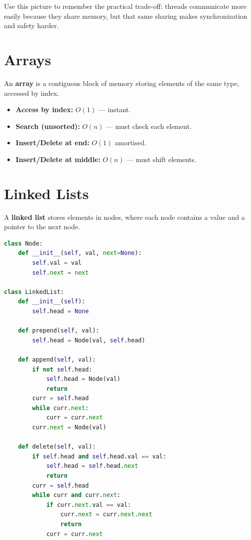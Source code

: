 \documentclass[12pt, a4paper, oneside]{book}
\begin{document}
Use this picture to remember the practical trade-off: threads communicate more easily because they share memory, but that same sharing makes synchronization and safety harder.

\section{Arrays}

An \textbf{array} is a contiguous block of memory storing elements of the same type, accessed by index.

\begin{itemize}[leftmargin=2em]
    \item \textbf{Access by index:} $O(1)$ --- instant.
    \item \textbf{Search (unsorted):} $O(n)$ --- must check each element.
    \item \textbf{Insert/Delete at end:} $O(1)$ amortised.
    \item \textbf{Insert/Delete at middle:} $O(n)$ --- must shift elements.
\end{itemize}

\section{Linked Lists}

A \textbf{linked list} stores elements in nodes, where each node contains a value and a pointer to the next node.

\begin{lstlisting}[language=Python, caption={Linked list implementation}]
class Node:
    def __init__(self, val, next=None):
        self.val = val
        self.next = next

class LinkedList:
    def __init__(self):
        self.head = None

    def prepend(self, val):
        self.head = Node(val, self.head)

    def append(self, val):
        if not self.head:
            self.head = Node(val)
            return
        curr = self.head
        while curr.next:
            curr = curr.next
        curr.next = Node(val)

    def delete(self, val):
        if self.head and self.head.val == val:
            self.head = self.head.next
            return
        curr = self.head
        while curr and curr.next:
            if curr.next.val == val:
                curr.next = curr.next.next
                return
            curr = curr.next
\end{lstlisting}
\end{document}
